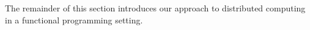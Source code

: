 \documentclass[tfpsymp,pagenumbers]{tfp07symp}
\begin{document}

\medskip

The remainder of this section introduces our approach to distributed
computing in a functional programming setting.
\end{document}
